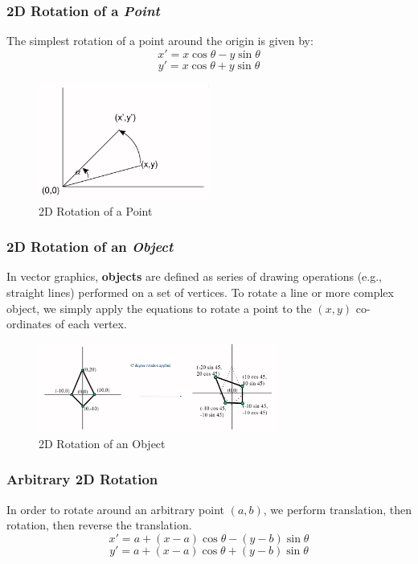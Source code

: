 \documentclass[a4paper,11pt]{article}
\begin{document}
\subsubsection{2D Rotation of a \textit{Point}}
The simplest rotation of a point around the origin is given by:
$$
x' = x \cos \theta - y \sin \theta
$$
$$
y' = x \cos \theta + y \sin \theta
$$

\begin{figure}[H]
    \centering
    \includegraphics[width=0.5\textwidth]{images/2d_point_rotation.png}
    \caption{2D Rotation of a Point}
\end{figure}

\subsubsection{2D Rotation of an \textit{Object}}
In vector graphics, \textbf{objects} are defined as series of drawing operations (e.g., straight lines) performed on a set 
of vertices.
To rotate a line or more complex object, we simply apply the equations to rotate a point to the $(x,y)$ co-ordinates of each 
vertex.

\begin{figure}[H]
    \centering
    \includegraphics[width=0.7\textwidth]{images/2d_object_rotation.png}
    \caption{2D Rotation of an Object}
\end{figure}

\subsubsection{Arbitrary 2D Rotation}
In order to rotate around an arbitrary point $(a,b)$, we perform translation, then rotation, then reverse the translation.
$$
x' = a + (x - a) \cos \theta - (y - b) \sin \theta
$$
$$
y' = a + (x - a) \cos \theta + (y - b) \sin \theta
$$
\end{document}
